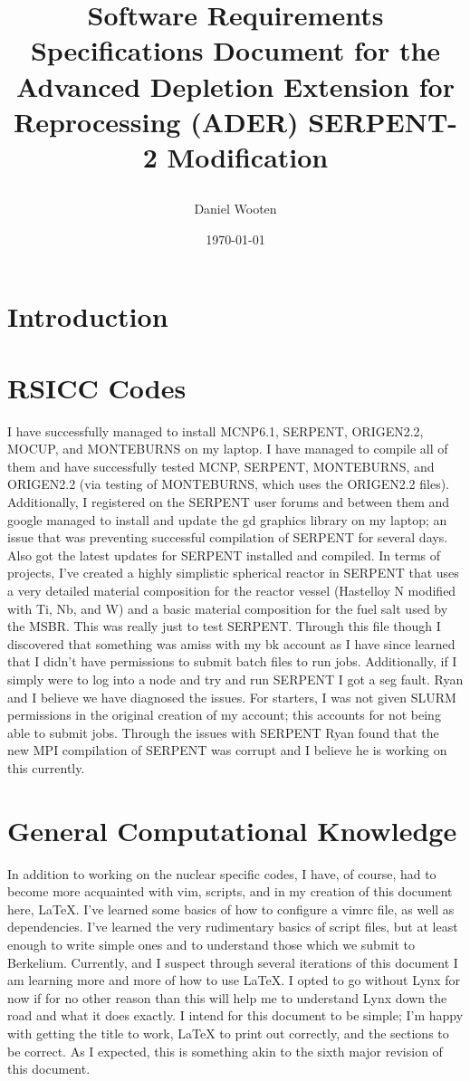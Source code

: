 \documentclass[12pt]{article}
\title{Software Requirements Specifications Document for the Advanced Depletion Extension for Reprocessing (ADER) SERPENT-2 Modification \\ {\small \date{\today}}}
\author{Daniel Wooten}
\begin{document}
\maketitle

\section{Introduction}

\section{RSICC Codes}
I have successfully managed to install MCNP6.1, SERPENT, ORIGEN2.2, MOCUP, and
MONTEBURNS on my laptop. I have managed to compile all of them and have successfully
tested MCNP, SERPENT, MONTEBURNS, and ORIGEN2.2 (via testing of MONTEBURNS, which uses
the ORIGEN2.2 files).
Additionally, I registered on the SERPENT user forums and between them and google managed
to install and update the gd graphics library on my laptop; an issue that was preventing
successful compilation of SERPENT for several days. Also got the latest updates for
SERPENT installed and compiled.
In terms of projects, I've created a highly simplistic spherical reactor in SERPENT
that uses a very detailed material composition for the reactor vessel (Hastelloy N
modified with Ti, Nb, and W) and a basic material composition for the fuel salt used
by the MSBR. This was really just to test SERPENT.
Through this file though I discovered that something was amiss with my bk account as I
have since learned that I didn't have permissions to submit batch files to run jobs. Additionally,
if I simply were to log into a node and try and run SERPENT I got a seg fault. Ryan and I
believe we have diagnosed the issues. For starters, I was not given SLURM permissions
in the original creation of my account; this accounts for not being able to submit jobs.
Through the issues with SERPENT Ryan found that the new MPI compilation of SERPENT
was corrupt and I believe he is working on this currently.

\section{General Computational Knowledge}
In addition to working on the nuclear specific codes, I have, of course, had to become
more acquainted with vim, scripts, and in my creation of this document here, \LaTeX.
I've learned some basics of how to configure a vimrc file, as well as dependencies. I've
learned the very rudimentary basics of script files, but at least enough to write simple
ones and to understand those which we submit to Berkelium. Currently, and I suspect
through several iterations of this document I am learning more and more of how to use
\LaTeX. I opted to go without Lynx for now if for no other reason than this will help
me to understand Lynx down the road and what it does exactly. I intend for this document
to be simple; I'm happy with getting the title to work, \LaTeX{} to print out correctly, and the
sections to be correct. As I expected, this is something akin to the sixth major revision of this
document.
\end{document}
